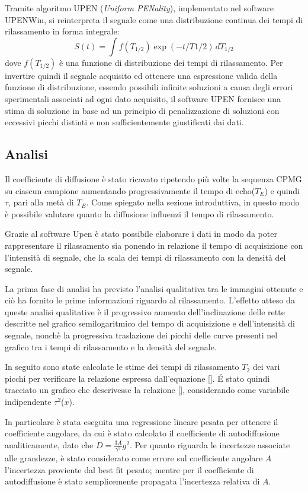 Tramite algoritmo UPEN (\textit{Uniform PENality}), implementato nel software UPENWin, si reinterpreta il segnale come una distribuzione continua dei tempi di rilassamento in forma integrale:
\begin{equation}
	S(t) = \int f(T_{1/2}) \exp(-t/T{1/2}) \, dT_{1/2}
\end{equation}
dove $f(T_{1/2})$ è una funzione di distribuzione dei tempi di rilassamento. Per invertire quindi il segnale acquisito ed ottenere una espressione valida della funzione di distribuzione, essendo possibili infinite soluzioni a causa degli errori sperimentali associati ad ogni dato acquisito, il software UPEN fornisce una stima di soluzione in base ad un principio di penalizzazione di soluzioni con eccessivi picchi distinti e non sufficientemente giustificati dai dati.

\subsection*{Analisi}

Il coefficiente di diffusione è stato ricavato ripetendo più volte la sequenza CPMG su ciascun campione aumentando progressivamente il tempo di echo($T_E$) e quindi $\tau$, pari alla metà di $T_E$.
Come spiegato nella sezione introduttiva, in questo modo è possibile  valutare quanto la diffusione influenzi il tempo di rilassamento.

Grazie al software Upen è stato possibile elaborare i dati in modo da poter rappresentare il rilassamento sia ponendo in relazione il tempo di acquisizione con l'intensità di segnale, che la scala dei tempi di rilassamento con la densità del segnale.

La prima fase di analisi ha previsto l'analisi qualitativa tra le immagini ottenute e ciò ha fornito le prime informazioni riguardo al rilassamento.
L'effetto atteso da queste analisi qualitative è il progressivo aumento dell'inclinazione delle rette descritte nel grafico semilogaritmico del tempo di acquisizione e dell'intensità di segnale, nonchè la progressiva traslazione dei picchi delle curve presenti nel grafico tra i tempi di rilassamento e la densità del segnale.

In seguito sono state calcolate le stime dei tempi di rilassamento $T_2$ dei vari picchi per verificare la relazione espressa dall'equazione \ref{}. 
\'E stato quindi tracciato un grafico che descrivesse la relazione \ref{}, considerando come variabile indipendente $\tau^2$($x$). 

In particolare è stata eseguita una regressione lineare pesata per ottenere il coefficiente angolare, da cui è stato calcolato il coefficiente di autodiffusione analiticamente, dato che $D=\frac{3A}{{\gamma}^2}g^2$.
Per quanto riguarda le incertezze associate alle grandezze, è stato considerato come errore sul coefficiente angolare $A$ l'incertezza proviente dal best fit pesato; mentre per il coefficiente di autodiffusione è stato semplicemente propagata l'incertezza relativa di $A$.


